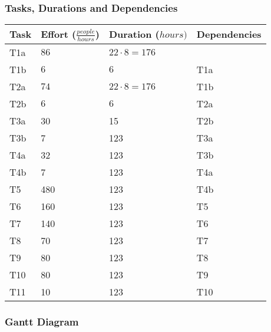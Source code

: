 \subsubsection{Tasks, Durations and Dependencies}
\lipsum[100]
\begin{center}
	\begin{tabulary}{\linewidth\tymin=70pt}{Y{2cm}|Y{3cm}|Y{2cm}|Y{2cm}}
		\textbf{Task} & \textbf{Effort ($\frac{people}{hours}$)} & \textbf{Duration\newline($hours)$} & \textbf{Dependencies} \\ \hline
		T1a &  $86$ & $22 \cdot 8 = 176$  & \\ \hline
		T1b & $6$ & $6$ & T1a \\ \hline
		T2a & $74$ & $22 \cdot 8 = 176$ & T1b \\ \hline
		T2b & $6$ & $6$ & T2a \\ \hline
		T3a & 30 & 15 & T2b \\ \hline
		T3b & 7 & 123 & T3a \\ \hline
		T4a & 32 & 123 & T3b \\ \hline
		T4b & 7 & 123 & T4a \\ \hline
		T5 & 480 & 123 & T4b \\ \hline
		T6 & 160 & 123 & T5 \\ \hline
		T7 & 140 & 123 & T6 \\ \hline
		T8 & 70 & 123 & T7 \\ \hline
		T9 & 80 & 123 & T8 \\ \hline
		T10 & 80 & 123 & T9 \\ \hline
		T11 & 10 & 123 & T10 \\ \hline
	\end{tabulary}
\end{center}
%
\subsubsection{Gantt Diagram}
\lipsum[100]
\begin{center}
	\begin{ganttchart}[hgrid=true,vgrid={draw=none, dotted}, x unit=4mm]{1}{24}
		 \\
		 \\
		 \\
		 \\
		 \\
	\end{ganttchart}
\end{center}
%